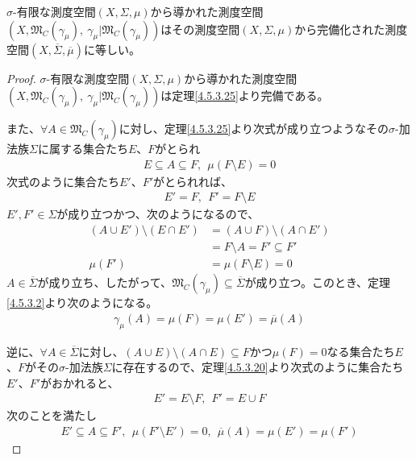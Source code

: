 \documentclass[dvipdfmx]{jsarticle}
\begin{document}
\begin{thm}\label{4.5.3.26}
$\sigma$-有限な測度空間$(X,\varSigma,\mu)$から導かれた測度空間$\left( X,\mathfrak{M}_{C}\left( \gamma_{\mu} \right),\ \gamma_{\mu}|\mathfrak{M}_{C}\left( \gamma_{\mu} \right) \right)$はその測度空間$(X,\varSigma,\mu)$から完備化された測度空間$\left( X,\overline{\varSigma},\overline{\mu} \right)$に等しい。
\end{thm}
\begin{proof}
$\sigma$-有限な測度空間$(X,\varSigma,\mu)$から導かれた測度空間$\left( X,\mathfrak{M}_{C}\left( \gamma_{\mu} \right),\ \gamma_{\mu}|\mathfrak{M}_{C}\left( \gamma_{\mu} \right) \right)$は定理\ref{4.5.3.25}より完備である。\par
また、$\forall A \in \mathfrak{M}_{C}\left( \gamma_{\mu} \right)$に対し、定理\ref{4.5.3.25}より次式が成り立つようなその$\sigma$-加法族$\varSigma$に属する集合たち$E$、$F$がとられ
\begin{align*}
E \subseteq A \subseteq F,\ \ \mu(F \setminus E) = 0
\end{align*}
次式のように集合たち$E'$、$F'$がとられれば、
\begin{align*}
E' = F,\ \ F' = F \setminus E
\end{align*}
$E',F' \in \varSigma$が成り立つかつ、次のようになるので、
\begin{align*}
\left( A \cup E' \right) \setminus \left( E \cap E' \right) &= (A \cup F) \setminus \left( A \cap E' \right)\\
&= F \setminus A = F' \subseteq F'\\
\mu\left( F' \right) &= \mu(F \setminus E) = 0
\end{align*}
$A \in \overline{\varSigma}$が成り立ち、したがって、$\mathfrak{M}_{C}\left( \gamma_{\mu} \right) \subseteq \overline{\varSigma}$が成り立つ。このとき、定理\ref{4.5.3.2}より次のようになる。
\begin{align*}
\gamma_{\mu}(A) = \mu(F) = \mu\left( E' \right) = \overline{\mu}(A)
\end{align*}\par
逆に、$\forall A \in \overline{\varSigma}$に対し、$(A \cup E) \setminus (A \cap E) \subseteq F$かつ$\mu(F) = 0$なる集合たち$E$、$F$がその$\sigma$-加法族$\varSigma$に存在するので、定理\ref{4.5.3.20}より次式のように集合たち$E'$、$F'$がおかれると、
\begin{align*}
E' = E \setminus F,\ \ F' = E \cup F
\end{align*}
次のことを満たし
\begin{align*}
E' \subseteq A \subseteq F',\ \ \mu\left( F' \setminus E' \right) = 0,\ \ \overline{\mu}(A) = \mu\left( E' \right) = \mu\left( F' \right)

\end{align*}
\end{proof}
\end{document}
